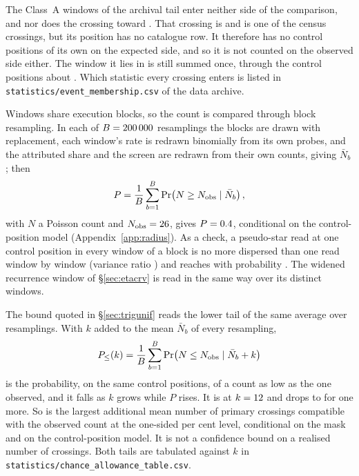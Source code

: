The \CeNWinTail{} Class~A windows of the archival tail enter neither side
of the comparison, and nor does the crossing toward \OmXStar. That crossing
is \MbUncatAttrWord{} and is one of the \CsNCross{} census crossings, but its
position has no catalogue row. It therefore has no control positions of its
own on the expected side, and so it is not counted on the observed side
either. The window it lies in is still summed once, through the control
positions about \MbUncatHost. Which statistic every crossing enters is
listed in \texttt{statistics/\allowbreak event\_membership.csv} of the data
archive.

Windows share execution blocks, so the count is compared through block
resampling. In each of $B=200\,000$ resamplings the blocks are drawn with
replacement, each window's rate is redrawn binomially from its own probes,
and the attributed share and the screen are redrawn from their own counts,
giving $\bar N_b$; then
\begin{equation*}
P=\frac{1}{B}\sum_{b=1}^{B}\Pr\!\left(N\ge N_{\rm obs}\mid\bar N_b\right),
\end{equation*}
with $N$ a Poisson count and $N_{\rm obs}=26$, gives $P=0.4$,
conditional on the control-position model (Appendix~\ref{app:radius}). As
a check, a pseudo-star read at one control position in every window of
a block is no more dispersed than one read window by window (variance ratio
\BgDisp) and reaches \CeObs{} with probability \BgPseudoP. The widened recurrence window
of \S\ref{sec:etacrv} is read in the same way over its \WuNWin{} distinct
windows.

The bound quoted in \S\ref{sec:trigunif} reads the lower tail of the same
average over resamplings. With $k$ added to the mean $\bar N_b$ of every resampling,
\begin{equation*}
P_{\le}(k)=\frac{1}{B}\sum_{b=1}^{B}\Pr\!\left(N\le N_{\rm obs}\mid\bar N_b+k\right)
\end{equation*}
is the probability, on the same control positions, of a count as low as the
one observed, and it falls as $k$ grows while $P$ rises. It is
\CeProbAtLim{} at $k=12$ and drops to \CeProbAboveLim{} for one more.
So \CeAddLim{} is the largest additional mean number of primary crossings
compatible with the observed count at the one-sided \CeAlphaPct{} per cent
level, conditional on the mask and on the control-position model. It is not
a confidence bound on a realised number of crossings. Both tails are
tabulated against $k$ in
\texttt{statistics/\allowbreak chance\_allowance\_table.csv}.

